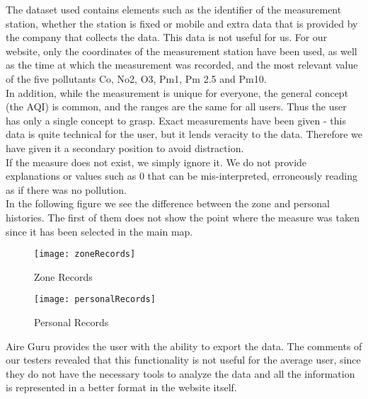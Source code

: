 The dataset used contains elements such as the identifier of the measurement station, whether the station is fixed or mobile
and extra data that is provided by the company that collects the data. This data is not useful for us.
For our website, only the coordinates of the measurement station have been used, as well as the time at which the measurement was recorded,
and the most relevant value of the five pollutants Co, No2, O3, Pm1, Pm 2.5 and Pm10.\\

In addition, while the measurement is unique for everyone, the general concept (the AQI) is common, and the ranges are the same for all users.
Thus the user has only a single concept to grasp. Exact measurements have been given - this data is quite technical for the user, but 
it lends veracity to the data. Therefore we have given it a secondary position to avoid distraction.\\

If the measure does not exist, we simply ignore it. We do not provide explanations or values such as 0 that can be mis-interpreted, erroneously reading as if there was no pollution.\\

In the following figure we see the difference between the zone and personal histories. The first of them does not show
the point where the measure was taken since it has been selected in the main map.\\


\begin{figure}[ht]
    \centering
    \texttt{[image: zoneRecords]}
    \caption{Zone Records}
\end{figure}

\begin{figure}[ht]
    \centering
    \texttt{[image: personalRecords]}
    \caption{Personal Records}
\end{figure}

Aire Guru provides the user with the ability to export the data. The comments of our testers revealed
that this functionality is not useful for the average user, since they do not have the necessary tools to
analyze the data and all the information is represented in a better format in the website itself.